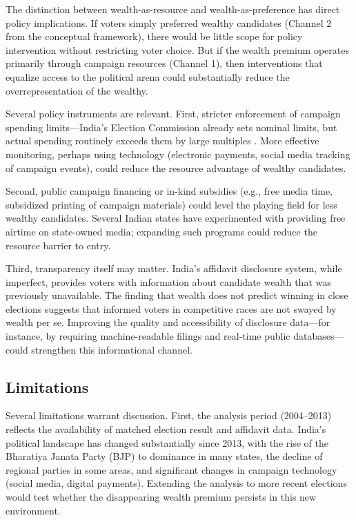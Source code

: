 \documentclass[12pt]{article}
\begin{document}
The distinction between wealth-as-resource and wealth-as-preference has direct policy implications. If voters simply preferred wealthy candidates (Channel 2 from the conceptual framework), there would be little scope for policy intervention without restricting voter choice. But if the wealth premium operates primarily through campaign resources (Channel 1), then interventions that equalize access to the political arena could substantially reduce the overrepresentation of the wealthy.

Several policy instruments are relevant. First, stricter enforcement of campaign spending limits---India's Election Commission already sets nominal limits, but actual spending routinely exceeds them by large multiples \citep{kapur2018rethinking}. More effective monitoring, perhaps using technology (electronic payments, social media tracking of campaign events), could reduce the resource advantage of wealthy candidates.

Second, public campaign financing or in-kind subsidies (e.g., free media time, subsidized printing of campaign materials) could level the playing field for less wealthy candidates. Several Indian states have experimented with providing free airtime on state-owned media; expanding such programs could reduce the resource barrier to entry.

Third, transparency itself may matter. India's affidavit disclosure system, while imperfect, provides voters with information about candidate wealth that was previously unavailable. The finding that wealth does not predict winning in close elections suggests that informed voters in competitive races are not swayed by wealth per se. Improving the quality and accessibility of disclosure data---for instance, by requiring machine-readable filings and real-time public databases---could strengthen this informational channel.

\subsection{Limitations}

Several limitations warrant discussion. First, the analysis period (2004--2013) reflects the availability of matched election result and affidavit data. India's political landscape has changed substantially since 2013, with the rise of the Bharatiya Janata Party (BJP) to dominance in many states, the decline of regional parties in some areas, and significant changes in campaign technology (social media, digital payments). Extending the analysis to more recent elections would test whether the disappearing wealth premium persists in this new environment.
\end{document}
